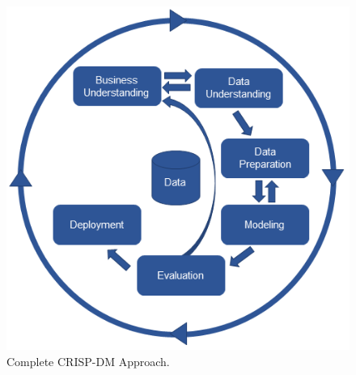 \begin{figure}[H]
    \centering
    \includegraphics[width=0.8\linewidth]{Chapters/img/crisp_dm.png}
    \caption{Complete CRISP-DM Approach.}
    \label{fig:crisp_dm}
\end{figure}

